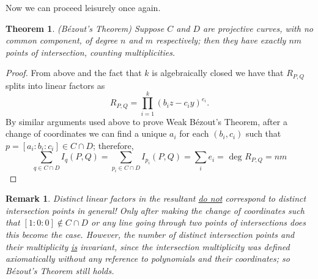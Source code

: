 \documentclass{article}
\newtheorem{theorem}{Theorem}
\newtheorem*{remark}{Remark}
\theoremstyle{remark}
\begin{document}
Now we can proceed leisurely once again.
\begin{theorem}
(Bézout's Theorem) Suppose $C$ and $D$ are projective curves, with no common component, of degree $n$ and $m$ respectively; then they have exactly $nm$ points of intersection, counting multiplicities.
\end{theorem}
\begin{proof}
From above and the fact that $k$ is algebraically closed we have that $R_{P,Q}$ splits into linear factors as
\[R_{P,Q}=\prod_{i=1}^{k} (b_i z-c_i y)^{e_i}.\]
By similar arguments used above to prove Weak Bézout's Theorem, after a change of coordinates we can find a unique $a_i$ for each $(b_i,c_i)$ such that $p=[a_i:b_i:c_i]\in C\cap D$; therefore,
\[ \sum_{q\in C\cap D}I_{q}(P,Q)=\sum_{p_i\in C\cap D}I_{p_i}(P,Q)=\sum_{i}e_i=\text{ deg } R_{P,Q}=nm\]
\end{proof}
\begin{remark}
Distinct linear factors in the resultant \underline{do not} correspond to distinct intersection points in general! Only after making the change of coordinates such that $[1:0:0]\notin C\cap D$ or any line going through two points of intersections does this become the case. However, the number of distinct intersection points and their multiplicity \underline{is} invariant, since the intersection multiplicity was defined axiomatically without any reference to polynomials and their coordinates; so Bézout's Theorem still holds.

\end{remark}
\par
\par
\end{document}

